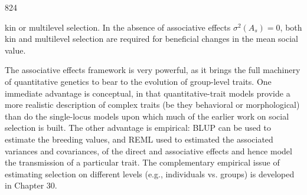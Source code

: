 \documentclass{article}
\begin{document}
824

kin or multilevel selection. In the absence of associative effects  $ \sigma^{2}(A_{s})=0 $, both kin and multilevel selection are required for beneficial changes in the mean social value.

The associative effects framework is very powerful, as it brings the full machinery of quantitative genetics to bear to the evolution of group-level traits. One immediate advantage is conceptual, in that quantitative-trait models provide a more realistic description of complex traits (be they behavioral or morphological) than do the single-locus models upon which much of the earlier work on social selection is built. The other advantage is empirical: BLUP can be used to estimate the breeding values, and REML used to estimated the associated variances and covariances, of the direct and associative effects and hence model the transmission of a particular trait. The complementary empirical issue of estimating selection on different levels (e.g., individuals vs. groups) is developed in Chapter 30.
\end{document}
